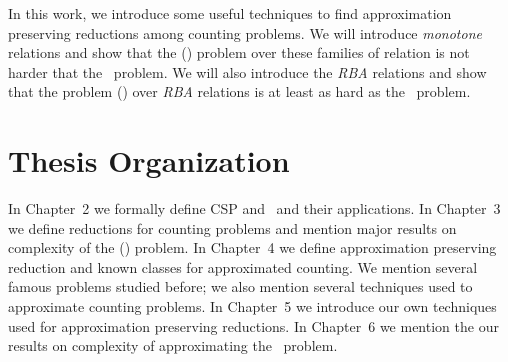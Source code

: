 In this work, we introduce some useful techniques to find approximation preserving reductions
among counting problems. We will introduce \emph{monotone} relations
and show that the \ccsp(\mrelset) problem over these families of relation is not harder that
the \cbis\ problem. We will also introduce the \emph{RBA} relations and
show that the problem \ccsp(\mrelset) over \emph{RBA} relations is at
least as hard as the \cbis\ problem.

\section{Thesis Organization}
In Chapter~2 we formally define CSP and \ccsp\ and their applications.
In Chapter~3 we define reductions for counting problems and mention major results
on complexity of the \ccsp(\mrelset) problem. In Chapter~4 we define approximation preserving
reduction and known classes for approximated counting. We mention several famous problems studied before;
we also mention several techniques used to approximate counting problems.
In Chapter~5 we introduce our own techniques used for approximation preserving reductions.
In Chapter~6 we mention the our results on complexity of approximating the \cbis\ problem.
